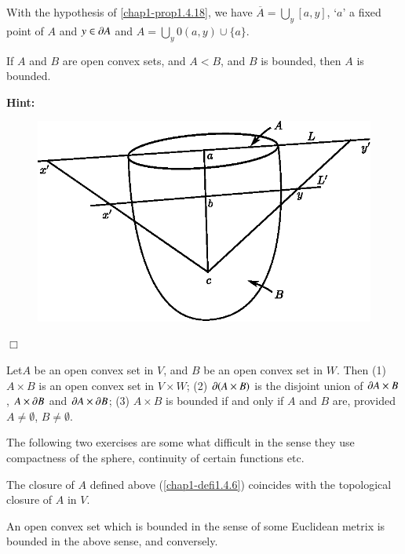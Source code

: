 \begin{remark*}
With the hypothesis of \ref{chap1-prop1.4.18}, we have $\overline{A}=\bigcup\limits_{y}[a,y]$, `$a$' a fixed point of $A$ and $y\in \partial A$ and $A=\bigcup\limits_{y}0(a,y)\cup \{a\}$. 
\end{remark*}

\begin{ex}\label{chap1-ex1.4.19}
If $A$ and $B$ are open convex sets, and $A<B$, and $B$ is bounded, then $A$ is bounded.
\end{ex}

\noindent
{\bf Hint:}
\begin{figure}[H]
\centering
\includegraphics{figure/fig5.eps}
\end{figure}
\hfill$\Box$

\begin{ex}\label{chap1-ex1.4.20}
Let\pageoriginale $A$ be an open convex set in $V$, and $B$ be an open convex set in $W$. Then (1) $A\times B$ is an open convex set in $V\times W$; (2) $\partial (A\times B)$ is the disjoint union of $\partial A\times B$, $A\times \partial B$ and $\partial A\times \partial B$; (3) $A\times B$ is bounded if and only if $A$ and $B$ are, provided $A\neq \emptyset$, $B\neq \emptyset$.
\end{ex}

The following two exercises are some what difficult in the sense they use compactness of the sphere, continuity of certain functions etc.

\begin{ex}\label{chap1-ex1.4.21}
The closure of $A$ defined above (\ref{chap1-defi1.4.6}) coincides with the topological closure of $A$ in $V$.
\end{ex}

\begin{ex}\label{chap1-ex1.4.22}
An open convex set which is bounded in the sense of some Euclidean metrix is bounded in the above sense, and conversely.
\end{ex}

